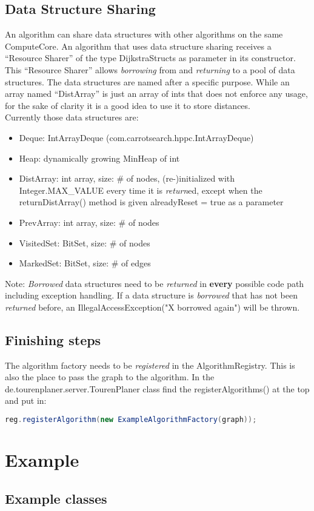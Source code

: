 \documentclass[ngerman,titlepage,parskip=true]{scrartcl}
\begin{document}
  \label{sharing}
  \subsection{Data Structure Sharing}
  An algorithm can share data structures with other algorithms on the same ComputeCore. An algorithm that uses data structure sharing receives a ``Resource Sharer'' of the type DijkstraStructs as parameter in its constructor. This ``Resource Sharer'' allows \textit{borrowing} from and \textit{returning} to a pool of data structures. The data structures are named after a specific purpose. While an array named ``DistArray'' is just an array of ints that does not enforce any usage, for the sake of clarity it is a good idea to use it to store distances.\\
  Currently those data structures are:
  \begin{itemize}
    \item Deque: IntArrayDeque (com.carrotsearch.hppc.IntArrayDeque)
    \item Heap: dynamically growing MinHeap of int
    \item DistArray: int array, size: \# of nodes, (re-)initialized with Integer.MAX\_VALUE every time it is \textit{return}ed, except when the returnDistArray() method is given alreadyReset = true as a parameter
    \item PrevArray: int array, size: \# of nodes
    \item VisitedSet: BitSet, size: \# of nodes
    \item MarkedSet: BitSet, size: \# of edges
  \end{itemize}
  Note: \textit{Borrowed} data structures need to be \textit{returned} in \textbf{every} possible code path including exception handling. If a data structure is \textit{borrowed} that has not been \textit{returned} before, an IllegalAccessException("X borrowed again") will be thrown.

  \subsection{Finishing steps}
  The algorithm factory needs to be \textit{registered} in the AlgorithmRegistry. This is also the place to pass the graph to the algorithm.
  In the de.tourenplaner.server.TourenPlaner class find the registerAlgorithms() at the top and put in:
  \begin{lstlisting}[language=java,caption=register your algorithm factory]
          reg.registerAlgorithm(new ExampleAlgorithmFactory(graph));
  \end{lstlisting}
  
  \section{Example}
	 \subsection{Example classes}
	 
	 
\end{document}
